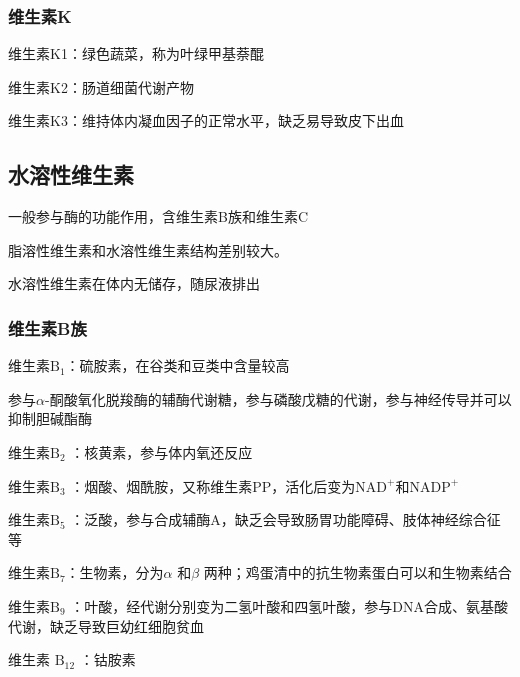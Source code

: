 \subsubsection{维生素K}%
\label{subsub:维生素K}
维生素K1：绿色蔬菜，称为叶绿甲基萘醌

维生素K2：肠道细菌代谢产物

维生素K3：维持体内凝血因子的正常水平，缺乏易导致皮下出血
\subsection{水溶性维生素}%
\label{sub:水溶性维生素}
一般参与酶的功能作用，含维生素B族和维生素C
\begin{notation}
    脂溶性维生素和水溶性维生素结构差别较大。

    水溶性维生素在体内无储存，随尿液排出
\end{notation}
\subsubsection{维生素B族}%
\label{ssub*:维生素B族}
\begin{notation}
    维生素$\text{B}_1$：硫胺素，在谷类和豆类中含量较高

    参与$\alpha$-酮酸氧化脱羧酶的辅酶代谢糖，参与磷酸戊糖的代谢，参与神经传导并可以抑制胆碱酯酶
\end{notation}
\begin{notation}
    维生素$\text{B}_2$ ：核黄素，参与体内氧还反应
\end{notation}
\begin{notation}
    维生素$\text{B}_3$ ：烟酸、烟酰胺，又称维生素PP，活化后变为$\text{NAD}^{+}$和$\text{NADP}^+$
\end{notation}
\begin{notation}
    维生素$\text{B}_5$ ：泛酸，参与合成辅酶A，缺乏会导致肠胃功能障碍、肢体神经综合征等
\end{notation}
\begin{notation}
    维生素$\text{B}_7$：生物素，分为$\alpha$ 和$\beta$ 两种；鸡蛋清中的抗生物素蛋白可以和生物素结合
\end{notation}
\begin{notation}
    维生素$\text{B}_9$ ：叶酸，经代谢分别变为二氢叶酸和四氢叶酸，参与DNA合成、氨基酸代谢，缺乏导致巨幼红细胞贫血
\end{notation}
\begin{notation}
    维生素 $\text{B}_{12}$ ：钴胺素
\end{notation}
